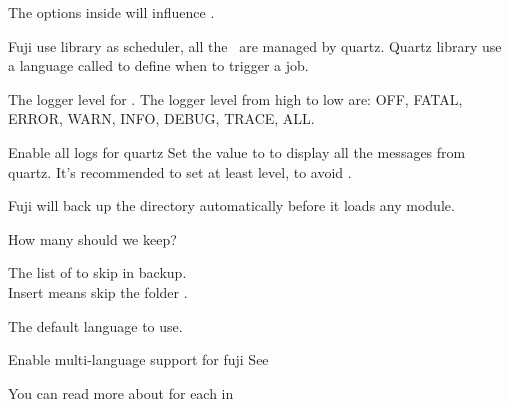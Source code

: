 \label{ch:configuration}



The  options inside  will influence .

Fuji use  library as scheduler, all the~ are managed by quartz.
Quartz library use a language called  to define when to trigger a job.

The logger level for .
The logger level from high to low are: OFF, FATAL, ERROR, WARN, INFO, DEBUG, TRACE, ALL.

\begin{example}{Enable all logs for quartz}
    Set the value to  to display all the messages from quartz.
    It's recommended to set at least  level, to avoid .
\end{example}

Fuji will back up the  directory automatically before it loads any module.

How many  should we keep?

The list of  to skip in backup. \\
Insert  means skip the folder .

The default language to use.

\begin{tips}{Enable multi-language support for fuji}
    See~
\end{tips}


\clearpage
{}
You can read more about  for each  in 